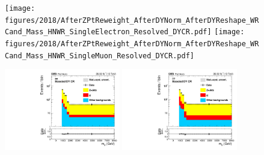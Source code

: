 \begin{figure}[htbp]
  \texttt{[image: figures/2018/AfterZPtReweight\_AfterDYNorm\_AfterDYReshape\_WRCand\_Mass\_HNWR\_SingleElectron\_Resolved\_DYCR.pdf]}
  \hspace{0.01\textwidth}
  \texttt{[image: figures/2018/AfterZPtReweight\_AfterDYNorm\_AfterDYReshape\_WRCand\_Mass\_HNWR\_SingleMuon\_Resolved\_DYCR.pdf]}


  \label{fig:AfterZPtReweight_AfterDYNorm_AfterDYReshape_WRCand_Mass_Resolved_DYCR}
\end{figure}

\begin{figure}[htbp]
  \centering

  \includegraphics[width=0.45\textwidth]{figures/2016/AfterZPtReweight_AfterDYNorm_AfterDYReshape_WRCand_Mass_HNWR_SingleElectron_Boosted_DYCR.pdf}
  \hspace{0.01\textwidth}
  \includegraphics[width=0.45\textwidth]{figures/2016/AfterZPtReweight_AfterDYNorm_AfterDYReshape_WRCand_Mass_HNWR_SingleMuon_Boosted_DYCR.pdf}
  \vspace{0.01\textwidth}


\end{figure}
